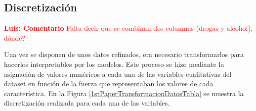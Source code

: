 \documentclass{uathesis-es}
\begin{document}
{	
	\subsection*{Discretización}
	
	\textcolor{red}{\textbf{Luis: Comentario} Falta decir que se combinan dos columnas (drogas y alcohol), dónde?}
	
	Una vez se disponen de unos datos refinados, era necesario transformarlos para hacerlos interpretables por los modelos. Este proceso se hizo mediante la asignación de valores numéricos a cada una de las variables cualitativas del dataset en función de la fuerza que representaban los valores de cada característica. En la Figura \ref{1stPaperTransformacionDatosTabla} se muestra la discretización realizada para cada una de las variables.
	
}
\end{document}
